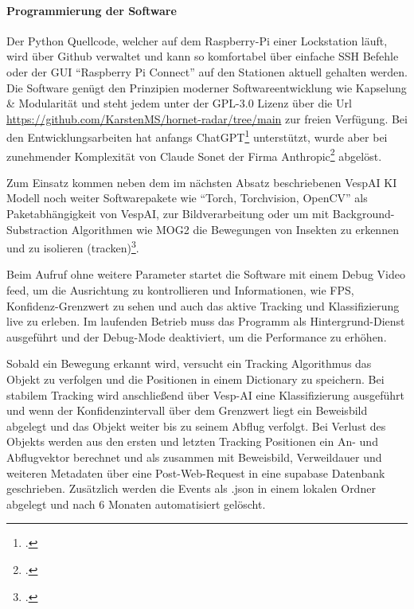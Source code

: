 \paragraph{Programmierung der Software}

Der Python Quellcode, welcher auf dem Raspberry-Pi einer Lockstation läuft, wird über Github verwaltet und kann so komfortabel über einfache \ac{SSH} Befehle oder der GUI \enquote{Raspberry Pi Connect} auf den Stationen aktuell gehalten werden. Die Software genügt den Prinzipien moderner Softwareentwicklung wie Kapselung \& Modularität und steht jedem unter der GPL-3.0 Lizenz über die Url \url{https://github.com/KarstenMS/hornet-radar/tree/main} zur freien Verfügung. Bei den Entwicklungsarbeiten hat anfangs ChatGPT\footcite[S. dazu][o. S.]{chatGPT} unterstützt, wurde aber bei zunehmender Komplexität von Claude Sonet der Firma Anthropic\footcite[S. dazu][o. S.]{claude} abgelöst.

Zum Einsatz kommen neben dem im nächsten Absatz beschriebenen VespAI KI Modell noch weiter Softwarepakete wie \enquote{Torch, Torchvision, OpenCV} als Paketabhängigkeit von VespAI, zur Bildverarbeitung oder um mit Background-Substraction Algorithmen wie \ac{MOG2} die Bewegungen von Insekten zu erkennen und zu isolieren (tracken)\footcite[Vgl.][o. S.]{mog2}.

Beim Aufruf ohne weitere Parameter startet die Software mit einem Debug Video feed, um die Ausrichtung zu kontrollieren und Informationen, wie \ac{FPS}, Konfidenz-Grenzwert zu sehen und auch das aktive Tracking und Klassifizierung live zu erleben. Im laufenden Betrieb muss das Programm als Hintergrund-Dienst ausgeführt und der Debug-Mode deaktiviert, um die Performance zu erhöhen. 

Sobald ein Bewegung erkannt wird, versucht ein Tracking Algorithmus das Objekt zu verfolgen und die Positionen in einem \gls{Dictionary} zu speichern. Bei stabilem Tracking wird anschließend über Vesp-AI eine Klassifizierung ausgeführt und wenn der Konfidenzintervall über dem Grenzwert liegt ein Beweisbild abgelegt und das Objekt weiter bis zu seinem Abflug verfolgt. Bei Verlust des Objekts werden aus den ersten und letzten Tracking Positionen ein An- und Abflugvektor berechnet und als zusammen mit Beweisbild, Verweildauer und weiteren Metadaten über eine Post-Web-Request in eine supabase Datenbank geschrieben. Zusätzlich werden die Events als .json in einem lokalen Ordner abgelegt und nach 6 Monaten automatisiert gelöscht.

